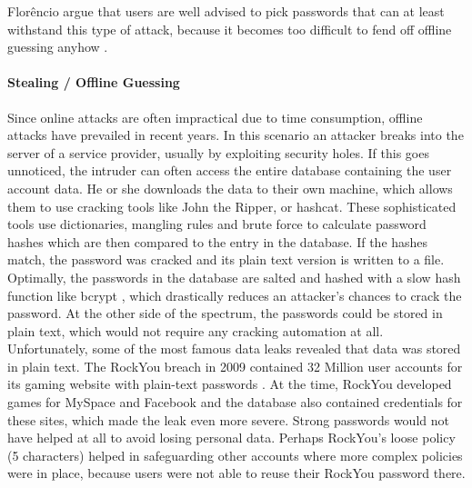 Florêncio \etal argue that users are well advised to pick passwords that can at least withstand this type of attack, because it becomes too difficult to fend off offline guessing anyhow \cite{Florencio2014AdministratorsGuide, Florencio2014PasswordPortfoliosFiniteUser, Florencio2016CommACM}. 


\paragraph{Stealing / Offline Guessing} Since online attacks are often impractical due to time consumption, offline attacks have prevailed in recent years. 
In this scenario an attacker breaks into the server of a service provider, usually by exploiting security holes. If this goes unnoticed, the intruder can often access the entire database containing the user account data. He or she downloads the data to their own machine, which allows them to use cracking tools like John the Ripper, or hashcat. These sophisticated tools use dictionaries, mangling rules and brute force to calculate password hashes which are then compared to the entry in the database. If the hashes match, the password was cracked and its plain text version is written to a file. 
Optimally, the passwords in the database are salted and hashed with a slow hash function like bcrypt \cite{Provos1999bcrypt}, which drastically reduces an attacker's chances to crack the password. At the other side of the spectrum, the passwords could be stored in plain text, which would not require any cracking automation at all. Unfortunately, some of the most famous data leaks revealed that data was stored in plain text. 
The RockYou breach in 2009 contained 32 Million user accounts for its gaming website with plain-text passwords \cite{Bonneau2012ScienceOfGuessing, Weir2010MetricsPolicies}. At the time, RockYou developed games for MySpace and Facebook and the database also contained credentials for these sites, which made the leak even more severe. Strong passwords would not have helped at all to avoid losing personal data. Perhaps RockYou's loose policy (5 characters) helped in safeguarding other accounts where more complex policies were in place, because users were not able to reuse their RockYou password there. 

